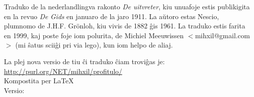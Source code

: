 \begin{minipage}[t]{\textwidth}
 Traduko de la nederlandlingva rakonto {\em De uitvreter}, kiu unuafoje
 estis publikigita en la revuo {\em De Gids} en januaro de la jaro
  1911. La a\u{u}toro estas Nescio, plumnomo de J.H.F. Gr\"onloh, kiu
  vivis de 1882 \^gis 1961.  La traduko estis farita  en 1999, kaj
  poste foje iom polurita,  de Michiel  Meeuwissen
  $<$mihxil@gmail.com$>$ (mi \^satus scii\^gi pri via lego), kun iom helpo de aliaj.

  La plej nova versio de tiu \^ci traduko \^ciam trovi\^gas je:\\
  \href{http://purl.org/NET/mihxil/profitulo/}{http://purl.org/NET/mihxil/profitulo/}\\

  Kompostita per \LaTeX\\
  Versio: 
\end{minipage}
